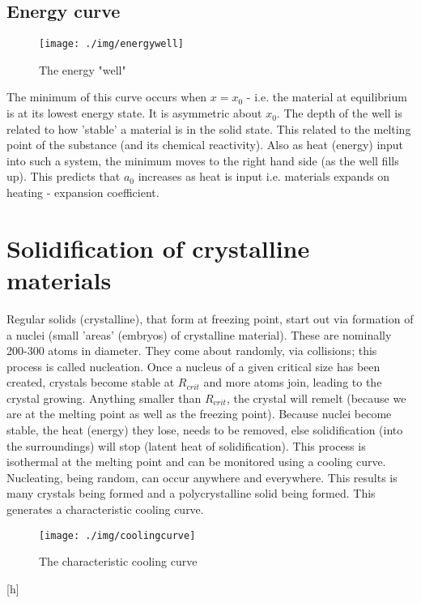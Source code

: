 \subsection{Energy curve}
\begin{figure}[h]
  \centering
  \texttt{[image: ./img/energywell]}
  \caption{The energy "well"}
  \label{fig:energycurve}
\end{figure}
The minimum of this curve occurs when $x=x_0$ - i.e. the material at equilibrium is at its lowest energy state. It is asymmetric about $x_0$. The depth of the well is related to how 'stable' a material is in the solid state. This related to the melting point of the substance (and its chemical reactivity). Also as heat (energy) input into such a system, the minimum moves to the right hand side (as the well fills up). This predicts that $a_0$ increases as heat is input i.e. materials expands on heating - expansion coefficient.
\section{Solidification of crystalline materials}
Regular solids (crystalline), that form at freezing point, start out via formation of a nuclei (small 'areas' (embryos) of crystalline material). These are nominally 200-300 atoms in diameter. They come about randomly, via collisions; this process is called nucleation. Once a nucleus of a given critical size has been created, crystals become stable at $R_{crit}$ and more atoms join, leading to the crystal growing. Anything smaller than $R_{crit}$, the crystal will remelt (because we are at the melting point as well as the freezing point). Because nuclei become stable, the heat (energy) they lose, needs to be removed, else solidification (into the surroundings) will stop (latent heat of solidification). This process is isothermal at the melting point and can be monitored using a cooling curve. Nucleating, being random, can occur anywhere and everywhere. This results is many crystals being formed and a polycrystalline solid being formed. This generates a characteristic cooling curve.
\begin{figure}[h]
  \centering
  \texttt{[image: ./img/coolingcurve]}
  \caption{The characteristic cooling curve}
  \label{fig:coolingcurve}
\end{figure}[h]
